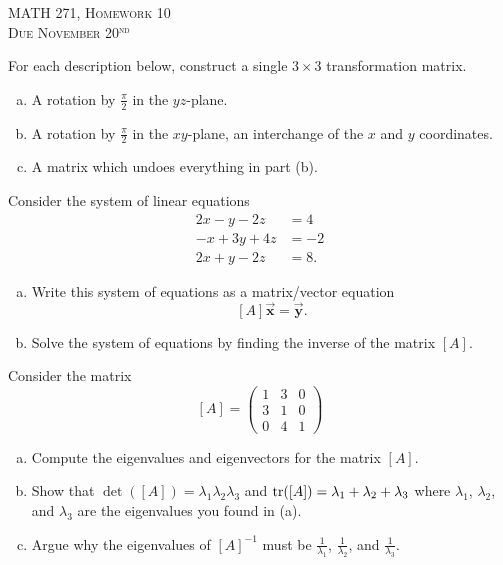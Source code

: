 \documentclass[12pt]{article} %
\newcommand{\vecx}{\boldsymbol{\vec{x}}}
\newcommand{\vecy}{\boldsymbol{\vec{y}}}
\begin{document}
\begin{center}
   \textsc{\large MATH 271, Homework 10}\\
   \textsc{Due November 20$^\textrm{nd}$}
\end{center}
\vspace{.5cm}


\begin{problem}
For each description below, construct a single $3\times 3$ transformation matrix.
\begin{enumerate}[(a)]
    \item A rotation by $\frac{\pi}{2}$ in the $yz$-plane.
    \item A rotation by $\frac{\pi}{2}$ in the $xy$-plane, an interchange of the $x$ and $y$ coordinates.
    \item A matrix which undoes everything in part (b).
\end{enumerate}
\end{problem}


\begin{problem}
Consider the system of linear equations
\begin{align*}
    2x-y-2z&=4\\
    -x + 3y +4z &= -2\\
    2x+y-2z&=8.
\end{align*}
\begin{enumerate}[(a)]
    \item Write this system of equations as a matrix/vector equation
    \[
    [A]\vecx=\vecy.
    \]
    \item Solve the system of equations by finding the inverse of the matrix $[A]$.
\end{enumerate}
\end{problem}


\begin{problem}
Consider the matrix
\[
[A]=\begin{pmatrix} 1 & 3 & 0 \\ 3 & 1 & 0 \\
 0 & 4 & 1 \end{pmatrix}
\]
\begin{enumerate}[(a)]
    \item Compute the eigenvalues and eigenvectors for the matrix $[A]$.
    \item Show that $\det([A])=\lambda_1\lambda_2\lambda_3$ and $\mathrm{tr}([A])=\lambda_1 + \lambda_2+\lambda_3$ where $\lambda_1$, $\lambda_2$, and $\lambda_3$ are the eigenvalues you found in (a).
    \item Argue why the eigenvalues of $[A]^{-1}$ must be $\frac{1}{\lambda_1}$, $\frac{1}{\lambda_2}$, and $\frac{1}{\lambda_3}$.
\end{enumerate}
\end{problem}
\end{document}
